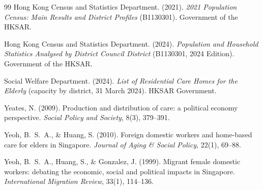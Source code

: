 \documentclass[11pt,a4paper]{article}
\begin{document}
\begin{thebibliography}{99}
Hong Kong Census and Statistics Department. (2021).
\newblock \emph{2021 Population Census: Main Results and District Profiles} (B1130301).
\newblock Government of the HKSAR.

Hong Kong Census and Statistics Department. (2024).
\newblock \emph{Population and Household Statistics Analysed by District Council District} (B1130301, 2024 Edition).
\newblock Government of the HKSAR.

Social Welfare Department. (2024).
\newblock \emph{List of Residential Care Homes for the Elderly} (capacity by district, 31 March 2024).
\newblock HKSAR Government.

Yeates, N. (2009).
\newblock Production and distribution of care: a political economy perspective.
\newblock \emph{Social Policy and Society}, 8(3), 379--391.

Yeoh, B.~S.~A., \& Huang, S. (2010).
\newblock Foreign domestic workers and home-based care for elders in Singapore.
\newblock \emph{Journal of Aging \& Social Policy}, 22(1), 69--88.

Yeoh, B.~S.~A., Huang, S., \& Gonzalez, J. (1999).
\newblock Migrant female domestic workers: debating the economic, social and political impacts in Singapore.
\newblock \emph{International Migration Review}, 33(1), 114--136.

\end{thebibliography}
\end{document}
